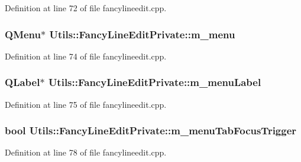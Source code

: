 Definition at line 72 of file fancylineedit.\-cpp.

\hypertarget{class_utils_1_1_fancy_line_edit_private_a49c75a34391e9c7eb95f8d2db3629938}{
\subsubsection[{m\-\_\-menu}]{\setlength{\rightskip}{0pt plus 5cm}Q\-Menu$\ast$ Utils\-::\-Fancy\-Line\-Edit\-Private\-::m\-\_\-menu}}\label{class_utils_1_1_fancy_line_edit_private_a49c75a34391e9c7eb95f8d2db3629938}


Definition at line 74 of file fancylineedit.\-cpp.

\hypertarget{class_utils_1_1_fancy_line_edit_private_af0626a7a7714a1a52ca2de3284baa07e}{
\subsubsection[{m\-\_\-menu\-Label}]{\setlength{\rightskip}{0pt plus 5cm}Q\-Label$\ast$ Utils\-::\-Fancy\-Line\-Edit\-Private\-::m\-\_\-menu\-Label}}\label{class_utils_1_1_fancy_line_edit_private_af0626a7a7714a1a52ca2de3284baa07e}


Definition at line 75 of file fancylineedit.\-cpp.

\hypertarget{class_utils_1_1_fancy_line_edit_private_a9db3d32157258337faed26134c440674}{
\subsubsection[{m\-\_\-menu\-Tab\-Focus\-Trigger}]{\setlength{\rightskip}{0pt plus 5cm}bool Utils\-::\-Fancy\-Line\-Edit\-Private\-::m\-\_\-menu\-Tab\-Focus\-Trigger}}\label{class_utils_1_1_fancy_line_edit_private_a9db3d32157258337faed26134c440674}


Definition at line 78 of file fancylineedit.\-cpp.

